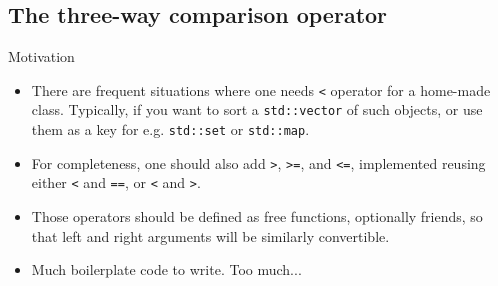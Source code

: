 \subsection[spaceship]{The three-way comparison operator}

\begin{frame}[fragile]
  \begin{block}{Motivation}
    \begin{itemize}
    \item There are frequent situations where one needs \texttt{<} operator for a home-made class. Typically, if you want to sort a \texttt{std::vector} of such objects, or use them as a key for e.g. \texttt{std::set} or \texttt{std::map}.
    \item For completeness, one should also add \texttt{>}, \texttt{>=}, and \texttt{<=}, implemented reusing either \texttt{<} and \texttt{==}, or \texttt{<} and \texttt{>}.
    \item Those operators should be defined as free functions, optionally friends, so that left and right arguments will be similarly convertible.
    \item Much boilerplate code to write. Too much...
    \end{itemize}
  \end{block}
\end{frame}

